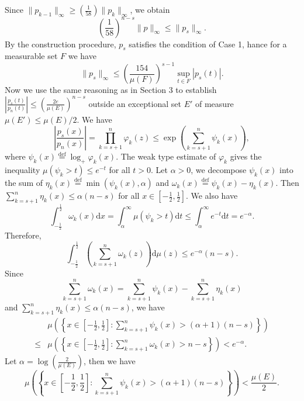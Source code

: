     Since $\|p_{k-1}\|_{\infty}\ge \left( \frac{1}{58} \right) \|p_{k}\|_{\infty}$, we obtain
    \begin{equation}
      \left( \frac{1}{58} \right) ^{n-s}\|p\|_{\infty}\le \|p_s\|_{\infty}.\label{G}
    \end{equation}
    By the  construction procedure, $p_s$ satisfies the condition of Case 1, hance for a measurable set  $F$ we have
     \begin{equation}
       \|p_s\|_{\infty}\le \left( \frac{154}{\mu(F)} \right) ^{s-1}\sup_{t\in F}\left| p_s(t) \right|.\label{F} 
    \end{equation}
    Now we use the same reasoning as in Section 3 to establish $\left| \frac{p_s(t)}{p_n(t)} \right| \le \left( \frac{2e}{\mu(E)} \right) ^{n-s}$ outside an exceptional set $E'$ of measure $\mu(E')\le \mu\left( E \right) /2$. We have
    \[
      \left| \frac{p_s(x)}{p_n(x)} \right| =\prod_{k=s+1}^{n}\varphi_k(z)\le \exp\left( \sum_{k=s+1}^{n} \psi_k(x) \right) ,
    \] where $\psi_k(x) \overset{\mathrm{def}}{=}\log_{+}\varphi_k(x)$. The weak type estimate of $\varphi_k$ gives the inequality $\mu \left( \psi_k>t \right) \le e^{-t}$ for all $t>0$. Let  $\alpha>0$, we decompose $\psi_k(x)$ into the sum of $\eta_k(x)\overset{\mathrm{def}}{=}\min \left( \psi_k(x),\alpha \right) $ and $\omega_k(x)\overset{\mathrm{def}}{=}\psi_k(x)-\eta_k(x)$. Then $\sum_{k=s+1}^{n}\eta_k(x)\le \alpha (n-s)$ for all $x \in \left[ -\frac{1}{2},\frac{1}{2} \right] $. We also have 
    \[
      \int_{-\frac{1}{2}}^{\frac{1}{2}}\omega_k(x)\mathrm{d}x=\int_\alpha ^{\infty}\mu\left( \psi_k>t \right) \mathrm{d}t\le \int_{\alpha}^{\infty}e^{-t}\mathrm{d}t=e^{-\alpha}.
    \] Therefore,
    \[
      \int_{-\frac{1}{2}}^{\frac{1}{2}}\left( \sum_{k=s+1}^{n} \omega_k(z) \right) \mathrm{d}\mu(z)\le e^{-\alpha}(n-s).
    \] 
    Since  
     \[
       \sum_{k=s+1}^{n} \omega_k(x)=\sum_{k=s+1}^{n} \psi_k(x)-\sum_{k=s+1}^{n} \eta_k(x)
     \] 
     and $\sum_{k=s+1}^{n} \eta_k(x)\le \alpha(n-s)$, we have
     \begin{align*}
      & \mu\left( \left\{ x\in \left[ -\frac{1}{2},\frac{1}{2} \right] : \sum_{k=s+1}^{n}\psi_k(x)>(\alpha+1)(n-s)  \right\}  \right) \\
       \le & \mu \left( \left\{ x\in \left[ -\frac{1}{2},\frac{1}{2} \right] : \sum_{k=s+1}^{n} \omega_k(x)>n-s \right\}  \right)<e^{-\alpha} . 
     \end{align*}
     Let $\alpha =\log \left( \frac{2}{\mu(E)} \right) $, then we have
      \[
	\mu\left(\left\{ x\in \left[ -\frac{1}{2},\frac{1}{2} \right] : \sum_{k=s+1}^{n} \psi_k(x)>(\alpha+1)(n-s)\right\} \right)< \frac{\mu(E)}{2}. 
     \]
